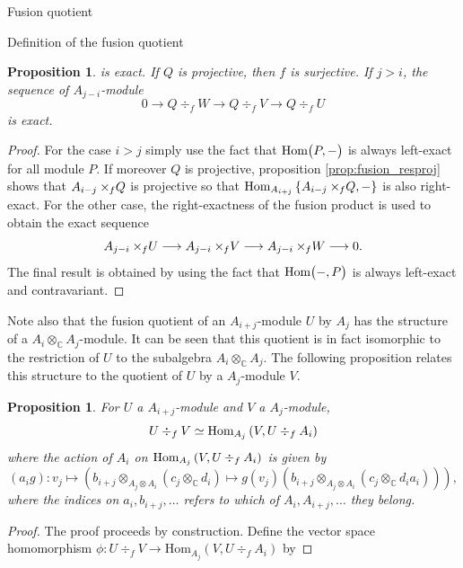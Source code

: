 \documentclass[reqno]{amsart}
\newtheorem{Prop}[Thm]{Proposition}
\newcommand{\xf}{\times\hspace{-0.27em}_f}
\newcommand{\Hom}[1]{\text{\rm{Hom}}\big( #1 \big)}
\begin{document}
\begin{section}{Fusion quotient}
\begin{subsection}{Definition of the fusion quotient}
\begin{Prop}
is exact. If $Q$ is projective, then $f$ is surjective. If $j>i$, the sequence of $A_{j-i}$-module
\begin{equation}
0 \longrightarrow Q\div_{f} W \longrightarrow Q\div_{f} V \longrightarrow Q \div_{f} U
\end{equation}
is exact.
\end{Prop}
\begin{proof}
For the case $i>j$ simply use the fact that $\Hom{P, - }$ is always left-exact for all module $P$. If moreover $Q$ is projective, proposition \ref{prop:fusion_resproj} shows that $A_{i-j} \xf Q$ is projective so that $\text{Hom}_{A_{i+j}}\left\{A_{i-j} \xf Q, - \right\}$ is also right-exact. For the other case, the right-exactness of the fusion product is used to obtain the exact sequence
\begin{equation}
A_{j-i} \xf U \longrightarrow A_{j-i} \xf V \longrightarrow A_{j-i} \xf W \longrightarrow 0.
\end{equation}
The final result is obtained by using the fact that $\Hom{ - ,P}$ is always left-exact and contravariant.
\end{proof}
Note also that the fusion quotient of an $A_{i+j}$-module  $U$ by $A_{j}$ has the structure of a $A_{i}\otimes_{\mathbb{C}}A_{j}$-module. It can be seen that this quotient is in fact isomorphic to the restriction of $U$ to the subalgebra $A_{i}\otimes_{\mathbb{C}}A_{j}$. The following proposition relates this structure to the quotient of $U$ by a $A_{j}$-module $V$.
\begin{Prop}\label{prop:fusionq.hom}
For $U$ a $A_{i+j}$-module and $V$ a $A_{j}$-module,
\begin{equation}
U\div_{f} V \simeq \text{\rm Hom}_{A_{j}}\left(V, U \div_{f} A_{i}\right)
\end{equation}
where the action of $A_{i}$ on $\text{\rm Hom}_{A_{j}}\left(V, U \div_{f} A_{i}\right)$ is given by
\begin{equation}
(a_i g): v_{j} \mapsto \left(b_{i+j} \otimes_{A_{j}\otimes A_{i}} \left(c_{j}\otimes_{\mathbb{C}} d_i\right) \mapsto g(v_{j})\left(b_{i+j} \otimes_{A_{j}\otimes A_{i}} \left(c_{j} \otimes_{\mathbb{C}} d_{i} a_{i}\right)\right) \right),
\end{equation}
where the indices on $a_i,b_{i+j},\hdots$ refers to which of $A_{i},A_{i+j},\hdots$ they belong.
\end{Prop}
\begin{proof}
The proof proceeds by construction. Define the vector space homomorphism $\phi:U\div_f V \to \text{Hom}_{A_{j}}\left(V, U \div_{f} A_{i}\right)$ by

\end{proof}
\end{subsection}
\end{section}
\end{document}
